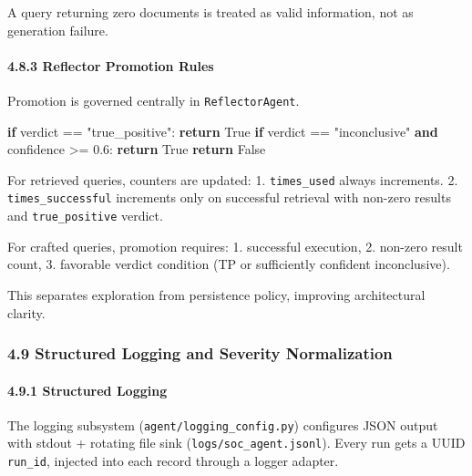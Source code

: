 \documentclass[
]{article}
\newenvironment{Shaded}{}{}
\newcommand{\ControlFlowTok}[1]{\textcolor[rgb]{0.00,0.44,0.13}{\textbf{#1}}}
\newcommand{\FloatTok}[1]{\textcolor[rgb]{0.25,0.63,0.44}{#1}}
\newcommand{\KeywordTok}[1]{\textcolor[rgb]{0.00,0.44,0.13}{\textbf{#1}}}
\newcommand{\NormalTok}[1]{#1}
\newcommand{\OperatorTok}[1]{\textcolor[rgb]{0.40,0.40,0.40}{#1}}
\newcommand{\StringTok}[1]{\textcolor[rgb]{0.25,0.44,0.63}{#1}}
\newcommand{\VariableTok}[1]{\textcolor[rgb]{0.10,0.09,0.49}{#1}}
\begin{document}
A query returning zero documents is treated as valid information, not as
generation failure.

\paragraph{4.8.3 Reflector Promotion
Rules}\label{reflector-promotion-rules}

Promotion is governed centrally in \texttt{ReflectorAgent}.

\begin{Shaded}
\begin{Highlighting}[]
\ControlFlowTok{if}\NormalTok{ verdict }\OperatorTok{==} \StringTok{"true\_positive"}\NormalTok{:}
    \ControlFlowTok{return} \VariableTok{True}
\ControlFlowTok{if}\NormalTok{ verdict }\OperatorTok{==} \StringTok{"inconclusive"} \KeywordTok{and}\NormalTok{ confidence }\OperatorTok{\textgreater{}=} \FloatTok{0.6}\NormalTok{:}
    \ControlFlowTok{return} \VariableTok{True}
\ControlFlowTok{return} \VariableTok{False}
\end{Highlighting}
\end{Shaded}

For retrieved queries, counters are updated: 1. \texttt{times\_used}
always increments. 2. \texttt{times\_successful} increments only on
successful retrieval with non-zero results and \texttt{true\_positive}
verdict.

For crafted queries, promotion requires: 1. successful execution, 2.
non-zero result count, 3. favorable verdict condition (TP or
sufficiently confident inconclusive).

This separates exploration from persistence policy, improving
architectural clarity.

\subsubsection{4.9 Structured Logging and Severity
Normalization}\label{structured-logging-and-severity-normalization}

\paragraph{4.9.1 Structured Logging}\label{structured-logging}

The logging subsystem (\texttt{agent/logging\_config.py}) configures
JSON output with stdout + rotating file sink
(\texttt{logs/soc\_agent.jsonl}). Every run gets a UUID
\texttt{run\_id}, injected into each record through a logger adapter.
\end{document}
